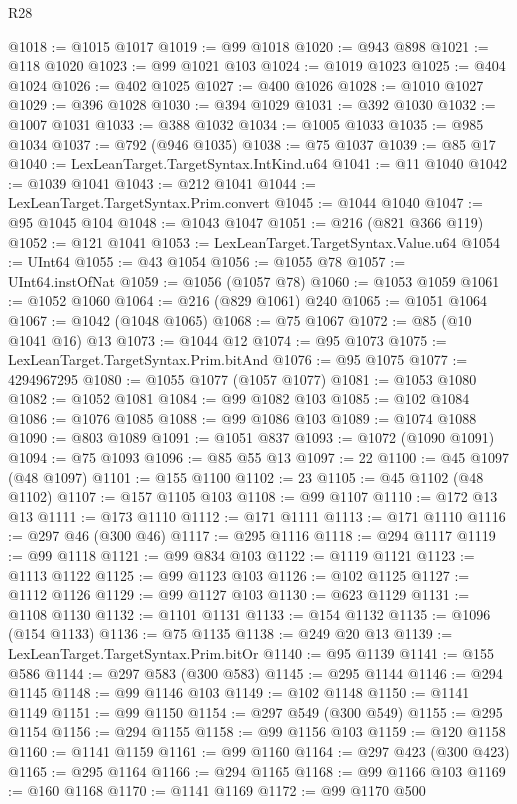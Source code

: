 \begin{lexlean}{R28}
\begin{coremodule}
@1018 := @1015 @1017
@1019 := @99 @1018
@1020 := @943 @898
@1021 := @118 @1020
@1023 := @99 @1021 @103
@1024 := @1019 @1023
@1025 := @404 @1024
@1026 := @402 @1025
@1027 := @400 @1026
@1028 := @1010 @1027
@1029 := @396 @1028
@1030 := @394 @1029
@1031 := @392 @1030
@1032 := @1007 @1031
@1033 := @388 @1032
@1034 := @1005 @1033
@1035 := @985 @1034
@1037 := @792 (@946 @1035)
@1038 := @75 @1037
@1039 := @85 @17
@1040 := LexLeanTarget.TargetSyntax.IntKind.u64
@1041 := @11 @1040
@1042 := @1039 @1041
@1043 := @212 @1041
@1044 := LexLeanTarget.TargetSyntax.Prim.convert
@1045 := @1044 @1040
@1047 := @95 @1045 @104
@1048 := @1043 @1047
@1051 := @216 (@821 @366 @119)
@1052 := @121 @1041
@1053 := LexLeanTarget.TargetSyntax.Value.u64
@1054 := UInt64
@1055 := @43 @1054
@1056 := @1055 @78
@1057 := UInt64.instOfNat
@1059 := @1056 (@1057 @78)
@1060 := @1053 @1059
@1061 := @1052 @1060
@1064 := @216 (@829 @1061) @240
@1065 := @1051 @1064
@1067 := @1042 (@1048 @1065)
@1068 := @75 @1067
@1072 := @85 (@10 @1041 @16) @13
@1073 := @1044 @12
@1074 := @95 @1073
@1075 := LexLeanTarget.TargetSyntax.Prim.bitAnd
@1076 := @95 @1075
@1077 := 4294967295
@1080 := @1055 @1077 (@1057 @1077)
@1081 := @1053 @1080
@1082 := @1052 @1081
@1084 := @99 @1082 @103
@1085 := @102 @1084
@1086 := @1076 @1085
@1088 := @99 @1086 @103
@1089 := @1074 @1088
@1090 := @803 @1089
@1091 := @1051 @837
@1093 := @1072 (@1090 @1091)
@1094 := @75 @1093
@1096 := @85 @55 @13
@1097 := 22
@1100 := @45 @1097 (@48 @1097)
@1101 := @155 @1100
@1102 := 23
@1105 := @45 @1102 (@48 @1102)
@1107 := @157 @1105 @103
@1108 := @99 @1107
@1110 := @172 @13 @13
@1111 := @173 @1110
@1112 := @171 @1111
@1113 := @171 @1110
@1116 := @297 @46 (@300 @46)
@1117 := @295 @1116
@1118 := @294 @1117
@1119 := @99 @1118
@1121 := @99 @834 @103
@1122 := @1119 @1121
@1123 := @1113 @1122
@1125 := @99 @1123 @103
@1126 := @102 @1125
@1127 := @1112 @1126
@1129 := @99 @1127 @103
@1130 := @623 @1129
@1131 := @1108 @1130
@1132 := @1101 @1131
@1133 := @154 @1132
@1135 := @1096 (@154 @1133)
@1136 := @75 @1135
@1138 := @249 @20 @13
@1139 := LexLeanTarget.TargetSyntax.Prim.bitOr
@1140 := @95 @1139
@1141 := @155 @586
@1144 := @297 @583 (@300 @583)
@1145 := @295 @1144
@1146 := @294 @1145
@1148 := @99 @1146 @103
@1149 := @102 @1148
@1150 := @1141 @1149
@1151 := @99 @1150
@1154 := @297 @549 (@300 @549)
@1155 := @295 @1154
@1156 := @294 @1155
@1158 := @99 @1156 @103
@1159 := @120 @1158
@1160 := @1141 @1159
@1161 := @99 @1160
@1164 := @297 @423 (@300 @423)
@1165 := @295 @1164
@1166 := @294 @1165
@1168 := @99 @1166 @103
@1169 := @160 @1168
@1170 := @1141 @1169
@1172 := @99 @1170 @500

\end{coremodule}
\end{lexlean}
